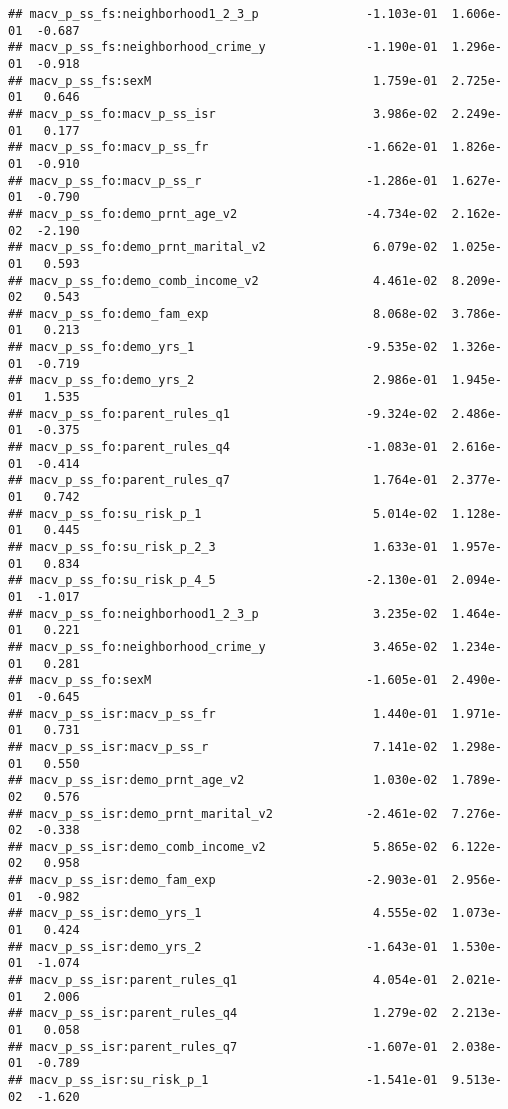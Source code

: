 \documentclass[
]{article}
\begin{document}
\begin{verbatim}
## macv_p_ss_fs:neighborhood1_2_3_p               -1.103e-01  1.606e-01  -0.687
## macv_p_ss_fs:neighborhood_crime_y              -1.190e-01  1.296e-01  -0.918
## macv_p_ss_fs:sexM                               1.759e-01  2.725e-01   0.646
## macv_p_ss_fo:macv_p_ss_isr                      3.986e-02  2.249e-01   0.177
## macv_p_ss_fo:macv_p_ss_fr                      -1.662e-01  1.826e-01  -0.910
## macv_p_ss_fo:macv_p_ss_r                       -1.286e-01  1.627e-01  -0.790
## macv_p_ss_fo:demo_prnt_age_v2                  -4.734e-02  2.162e-02  -2.190
## macv_p_ss_fo:demo_prnt_marital_v2               6.079e-02  1.025e-01   0.593
## macv_p_ss_fo:demo_comb_income_v2                4.461e-02  8.209e-02   0.543
## macv_p_ss_fo:demo_fam_exp                       8.068e-02  3.786e-01   0.213
## macv_p_ss_fo:demo_yrs_1                        -9.535e-02  1.326e-01  -0.719
## macv_p_ss_fo:demo_yrs_2                         2.986e-01  1.945e-01   1.535
## macv_p_ss_fo:parent_rules_q1                   -9.324e-02  2.486e-01  -0.375
## macv_p_ss_fo:parent_rules_q4                   -1.083e-01  2.616e-01  -0.414
## macv_p_ss_fo:parent_rules_q7                    1.764e-01  2.377e-01   0.742
## macv_p_ss_fo:su_risk_p_1                        5.014e-02  1.128e-01   0.445
## macv_p_ss_fo:su_risk_p_2_3                      1.633e-01  1.957e-01   0.834
## macv_p_ss_fo:su_risk_p_4_5                     -2.130e-01  2.094e-01  -1.017
## macv_p_ss_fo:neighborhood1_2_3_p                3.235e-02  1.464e-01   0.221
## macv_p_ss_fo:neighborhood_crime_y               3.465e-02  1.234e-01   0.281
## macv_p_ss_fo:sexM                              -1.605e-01  2.490e-01  -0.645
## macv_p_ss_isr:macv_p_ss_fr                      1.440e-01  1.971e-01   0.731
## macv_p_ss_isr:macv_p_ss_r                       7.141e-02  1.298e-01   0.550
## macv_p_ss_isr:demo_prnt_age_v2                  1.030e-02  1.789e-02   0.576
## macv_p_ss_isr:demo_prnt_marital_v2             -2.461e-02  7.276e-02  -0.338
## macv_p_ss_isr:demo_comb_income_v2               5.865e-02  6.122e-02   0.958
## macv_p_ss_isr:demo_fam_exp                     -2.903e-01  2.956e-01  -0.982
## macv_p_ss_isr:demo_yrs_1                        4.555e-02  1.073e-01   0.424
## macv_p_ss_isr:demo_yrs_2                       -1.643e-01  1.530e-01  -1.074
## macv_p_ss_isr:parent_rules_q1                   4.054e-01  2.021e-01   2.006
## macv_p_ss_isr:parent_rules_q4                   1.279e-02  2.213e-01   0.058
## macv_p_ss_isr:parent_rules_q7                  -1.607e-01  2.038e-01  -0.789
## macv_p_ss_isr:su_risk_p_1                      -1.541e-01  9.513e-02  -1.620

\end{verbatim}
\end{document}
